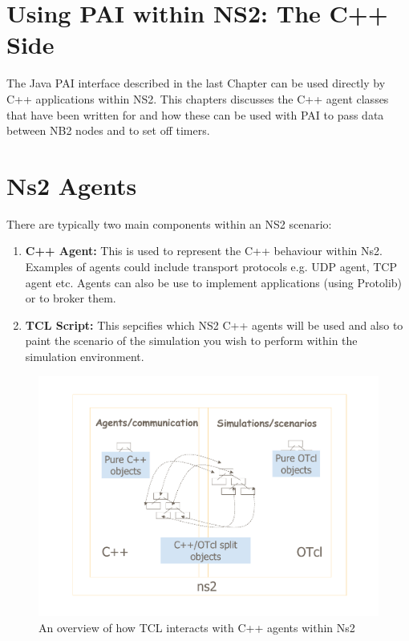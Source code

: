 \section{Using PAI within NS2: The C++ Side}
\label{jni:nodeint}


The Java PAI interface described in the last Chapter can be used 
directly by C++ applications within NS2.  This chapters discusses
the C++ agent classes that have been written for \agentj and
how these can be used with PAI to pass data between NB2 nodes
and to set off timers.

\section{Ns2 Agents}

There are typically two main components within an NS2 scenario:

\begin{enumerate}
\item \textbf{C++ Agent:} This is used to represent the C++ behaviour
within Ns2.  Examples of agents could include transport protocols e.g.
UDP agent, TCP agent etc.  Agents can also be use to implement 
applications (using Protolib) or to broker them. 
\item \textbf{TCL Script:} This sepcifies which NS2 C++ agents will be used
and also to paint the scenario of the simulation you wish to perform
within the simulation environment.
\end{enumerate}

\begin{figure}
\centering
\includegraphics[scale=0.4]{images/paiAgentsTCLandC}
\caption{An overview of how TCL interacts with C++ agents within Ns2 } 
\label{paiagent:fig:paiAgentsTCLandC}
\end{figure}

